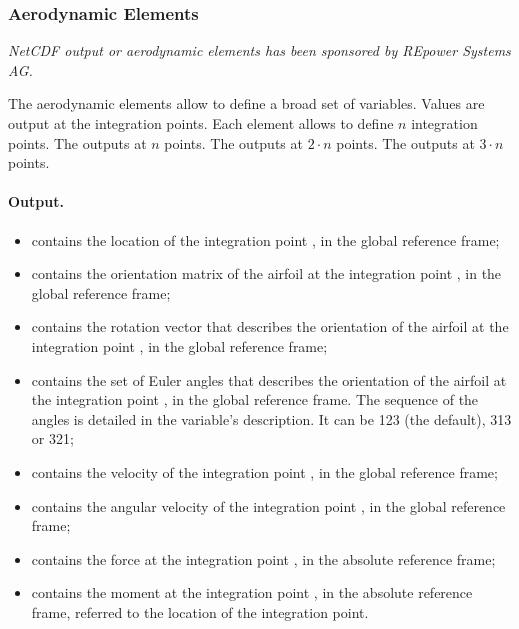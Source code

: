 \subsubsection{Aerodynamic Elements}
\label{sec:NetCDF:Elem:Aerodynamic}
\emph{NetCDF output or aerodynamic elements has been sponsored
by REpower Systems AG.}

The aerodynamic elements allow to define a broad set of variables.
Values are output at the integration points.
Each element allows to define $n$ integration points.
The  outputs at $n$ points.
The  outputs at $2 \cdot n$ points.
The  outputs at $3 \cdot n$ points.

\paragraph{Output.}
\begin{itemize}
\item {} contains the location
of the integration point , in the global reference frame;

\item {} contains the orientation matrix
of the airfoil at the integration point , in the global reference frame;

\item {} contains the rotation vector
that describes the orientation of the airfoil at the integration point ,
in the global reference frame;

\item {} contains the set of Euler angles
that describes the orientation of the airfoil at the integration point ,
in the global reference frame.
The sequence of the angles is detailed in the variable's description.
It can be 123 (the default), 313 or 321;

\item {} contains the velocity
of the integration point , in the global reference frame;

\item {} contains the angular velocity
of the integration point , in the global reference frame;

\item {} contains the force
at the integration point , in the absolute reference frame;

\item {} contains the moment
at the integration point , in the absolute reference frame,
referred to the location of the integration point.
\end{itemize}

